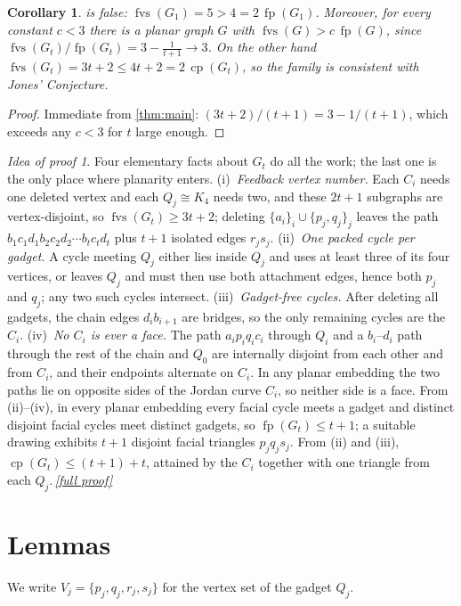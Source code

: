 \documentclass[11pt,a4paper]{article}
\theoremstyle{plain}
\newtheorem{corollary}[theorem]{Corollary}
\theoremstyle{definition}
\theoremstyle{remark}
\newtheorem*{proofidea}{Idea of proof}
\newcommand{\fullproofref}[1]{\,\hyperref[#1]{\textit{[full proof]}}}
\newcommand{\fvs}{\operatorname{fvs}}
\newcommand{\cp}{\operatorname{cp}}
\newcommand{\fp}{\operatorname{fp}}
\newcommand{\Gtt}{G_t}
\begin{document}
\begin{corollary}\label{cor:main}
 is false: $\fvs(G_1)=5>4=2\,\fp(G_1)$. Moreover, for every constant $c<3$ there is a planar graph $G$ with $\fvs(G)>c\,\fp(G)$, since $\fvs(\Gtt)/\fp(\Gtt)=3-\frac1{t+1}\to3$. On the other hand $\fvs(\Gtt)=3t+2\le 4t+2=2\,\cp(\Gtt)$, so the family is consistent with Jones' Conjecture.
\end{corollary}
\begin{proof}
Immediate from \cref{thm:main}: $(3t+2)/(t+1)=3-1/(t+1)$, which exceeds any $c<3$ for $t$ large enough.
\end{proof}

\begin{proofidea}
Four elementary facts about $\Gtt$ do all the work; the last one is the only place where planarity enters.
(i)~\emph{Feedback vertex number.} Each $C_i$ needs one deleted vertex and each $Q_j\cong K_4$ needs two, and these $2t+1$ subgraphs are vertex-disjoint, so $\fvs(\Gtt)\ge3t+2$; deleting $\{a_i\}_{i}\cup\{p_j,q_j\}_{j}$ leaves the path $b_1c_1d_1b_2c_2d_2\cdots b_tc_td_t$ plus $t+1$ isolated edges $r_js_j$.
(ii)~\emph{One packed cycle per gadget.} A cycle meeting $Q_j$ either lies inside $Q_j$ and uses at least three of its four vertices, or leaves $Q_j$ and must then use both attachment edges, hence both $p_j$ and $q_j$; any two such cycles intersect.
(iii)~\emph{Gadget-free cycles.} After deleting all gadgets, the chain edges $d_ib_{i+1}$ are bridges, so the only remaining cycles are the $C_i$.
(iv)~\emph{No $C_i$ is ever a face.} The path $a_ip_iq_ic_i$ through $Q_i$ and a $b_i$--$d_i$ path through the rest of the chain and $Q_0$ are internally disjoint from each other and from $C_i$, and their endpoints alternate on $C_i$. In any planar embedding the two paths lie on opposite sides of the Jordan curve $C_i$, so neither side is a face.
From (ii)--(iv), in every planar embedding every facial cycle meets a gadget and distinct disjoint facial cycles meet distinct gadgets, so $\fp(\Gtt)\le t+1$; a suitable drawing exhibits $t+1$ disjoint facial triangles $p_jq_js_j$. From (ii) and (iii), $\cp(\Gtt)\le(t+1)+t$, attained by the $C_i$ together with one triangle from each $Q_j$.\fullproofref{pf:main}
\end{proofidea}

\section{Lemmas}

We write $V_j=\{p_j,q_j,r_j,s_j\}$ for the vertex set of the gadget $Q_j$.
\end{document}
